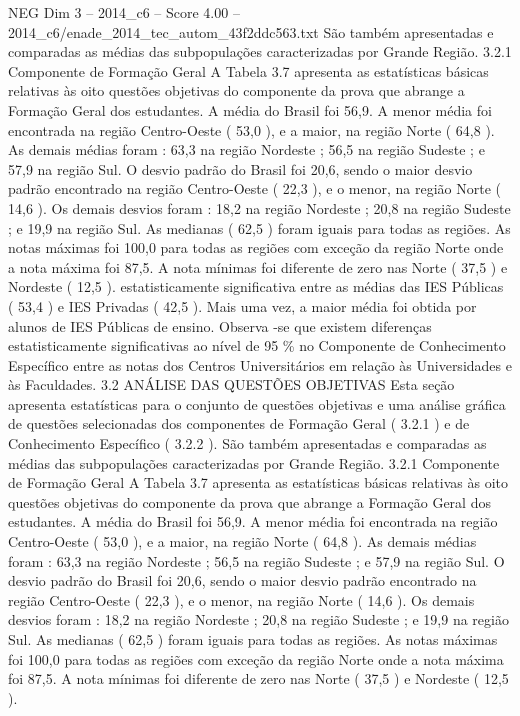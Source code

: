 \begin{textsample}{NEG Dim 3 – 2014\_c6 – Score 4.00 – 2014\_c6/enade\_2014\_tec\_autom\_43f2ddc563.txt}
São também apresentadas e comparadas as médias das subpopulações caracterizadas por Grande Região. 3.2.1 Componente de Formação Geral A Tabela 3.7 apresenta as estatísticas básicas relativas às oito questões objetivas do componente da prova que abrange a Formação Geral dos estudantes.
A média do Brasil foi 56,9.
A menor média foi encontrada na região Centro-Oeste ( 53,0 ), e a maior, na região Norte ( 64,8 ).
As demais médias foram : 63,3 na região Nordeste ; 56,5 na região Sudeste ; e 57,9 na região Sul.
O desvio padrão do Brasil foi 20,6, sendo o maior desvio padrão encontrado na região Centro-Oeste ( 22,3 ), e o menor, na região Norte ( 14,6 ).
Os demais desvios foram : 18,2 na região Nordeste ; 20,8 na região Sudeste ; e 19,9 na região Sul.
As medianas ( 62,5 ) foram iguais para todas as regiões.
As notas máximas foi 100,0 para todas as regiões com exceção da região Norte onde a nota máxima foi 87,5.
A nota mínimas foi diferente de zero nas Norte ( 37,5 ) e Nordeste ( 12,5 ). estatisticamente significativa entre as médias das IES Públicas ( 53,4 ) e IES Privadas ( 42,5 ).
Mais uma vez, a maior média foi obtida por alunos de IES Públicas de ensino.
Observa -se que existem diferenças estatisticamente significativas ao nível de 95 \% no Componente de Conhecimento Específico entre as notas dos Centros Universitários em relação às Universidades e às Faculdades. 3.2 ANÁLISE DAS QUESTÕES OBJETIVAS Esta seção apresenta estatísticas para o conjunto de questões objetivas e uma análise gráfica de questões selecionadas dos componentes de Formação Geral ( 3.2.1 ) e de Conhecimento Específico ( 3.2.2 ).
São também apresentadas e comparadas as médias das subpopulações caracterizadas por Grande Região. 3.2.1 Componente de Formação Geral A Tabela 3.7 apresenta as estatísticas básicas relativas às oito questões objetivas do componente da prova que abrange a Formação Geral dos estudantes.
A média do Brasil foi 56,9.
A menor média foi encontrada na região Centro-Oeste ( 53,0 ), e a maior, na região Norte ( 64,8 ).
As demais médias foram : 63,3 na região Nordeste ; 56,5 na região Sudeste ; e 57,9 na região Sul.
O desvio padrão do Brasil foi 20,6, sendo o maior desvio padrão encontrado na região Centro-Oeste ( 22,3 ), e o menor, na região Norte ( 14,6 ).
Os demais desvios foram : 18,2 na região Nordeste ; 20,8 na região Sudeste ; e 19,9 na região Sul.
As medianas ( 62,5 ) foram iguais para todas as regiões.
As notas máximas foi 100,0 para todas as regiões com exceção da região Norte onde a nota máxima foi 87,5.
A nota mínimas foi diferente de zero nas Norte ( 37,5 ) e Nordeste ( 12,5 ).

\end{textsample}
